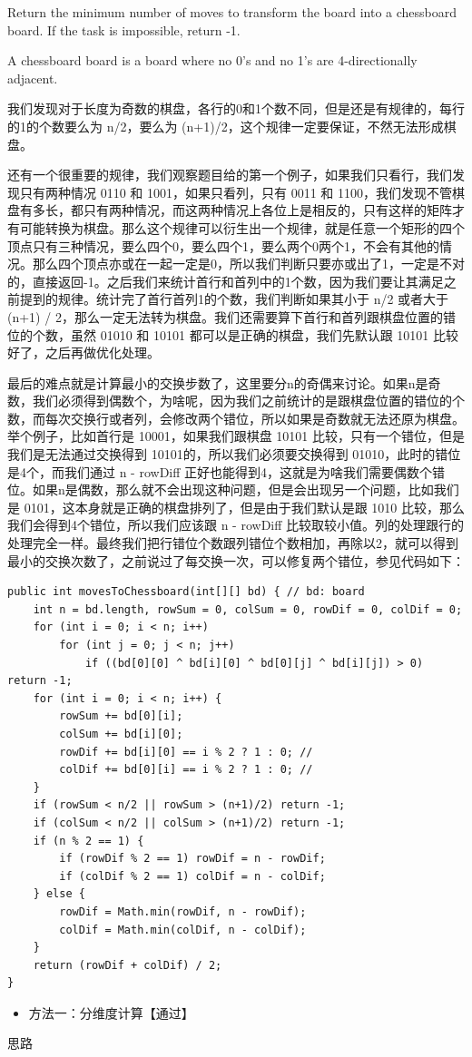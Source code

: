 \documentclass[9pt, b5paaper]{book}
\begin{document}
Return the minimum number of moves to transform the board into a chessboard board. If the task is impossible, return -1.

A chessboard board is a board where no 0's and no 1's are 4-directionally adjacent.

我们发现对于长度为奇数的棋盘，各行的0和1个数不同，但是还是有规律的，每行的1的个数要么为 n/2，要么为 (n+1)/2，这个规律一定要保证，不然无法形成棋盘。

还有一个很重要的规律，我们观察题目给的第一个例子，如果我们只看行，我们发现只有两种情况 0110 和 1001，如果只看列，只有 0011 和 1100，我们发现不管棋盘有多长，都只有两种情况，而这两种情况上各位上是相反的，只有这样的矩阵才有可能转换为棋盘。那么这个规律可以衍生出一个规律，就是任意一个矩形的四个顶点只有三种情况，要么四个0，要么四个1，要么两个0两个1，不会有其他的情况。那么四个顶点亦或在一起一定是0，所以我们判断只要亦或出了1，一定是不对的，直接返回-1。之后我们来统计首行和首列中的1个数，因为我们要让其满足之前提到的规律。统计完了首行首列1的个数，我们判断如果其小于 n/2 或者大于 (n+1) / 2，那么一定无法转为棋盘。我们还需要算下首行和首列跟棋盘位置的错位的个数，虽然 01010 和 10101 都可以是正确的棋盘，我们先默认跟 10101 比较好了，之后再做优化处理。

最后的难点就是计算最小的交换步数了，这里要分n的奇偶来讨论。如果n是奇数，我们必须得到偶数个，为啥呢，因为我们之前统计的是跟棋盘位置的错位的个数，而每次交换行或者列，会修改两个错位，所以如果是奇数就无法还原为棋盘。举个例子，比如首行是 10001，如果我们跟棋盘 10101 比较，只有一个错位，但是我们是无法通过交换得到 10101的，所以我们必须要交换得到 01010，此时的错位是4个，而我们通过 n - rowDiff 正好也能得到4，这就是为啥我们需要偶数个错位。如果n是偶数，那么就不会出现这种问题，但是会出现另一个问题，比如我们是 0101，这本身就是正确的棋盘排列了，但是由于我们默认是跟 1010 比较，那么我们会得到4个错位，所以我们应该跟 n - rowDiff 比较取较小值。列的处理跟行的处理完全一样。最终我们把行错位个数跟列错位个数相加，再除以2，就可以得到最小的交换次数了，之前说过了每交换一次，可以修复两个错位，参见代码如下：

\begin{verbatim}
public int movesToChessboard(int[][] bd) { // bd: board
    int n = bd.length, rowSum = 0, colSum = 0, rowDif = 0, colDif = 0;
    for (int i = 0; i < n; i++) 
        for (int j = 0; j < n; j++)
            if ((bd[0][0] ^ bd[i][0] ^ bd[0][j] ^ bd[i][j]) > 0) return -1;
    for (int i = 0; i < n; i++) {
        rowSum += bd[0][i];
        colSum += bd[i][0];
        rowDif += bd[i][0] == i % 2 ? 1 : 0; // 
        colDif += bd[0][i] == i % 2 ? 1 : 0; // 
    }
    if (rowSum < n/2 || rowSum > (n+1)/2) return -1;
    if (colSum < n/2 || colSum > (n+1)/2) return -1;
    if (n % 2 == 1) {
        if (rowDif % 2 == 1) rowDif = n - rowDif;
        if (colDif % 2 == 1) colDif = n - colDif;
    } else {
        rowDif = Math.min(rowDif, n - rowDif);
        colDif = Math.min(colDif, n - colDif);
    }
    return (rowDif + colDif) / 2;
}
\end{verbatim}
\begin{itemize}
\item 方法一：分维度计算【通过】
\end{itemize}
思路
\end{document}
